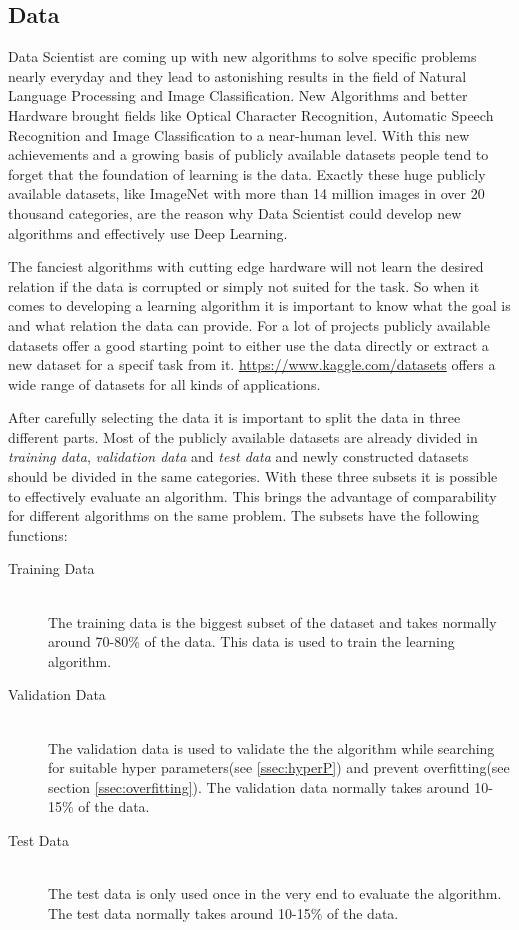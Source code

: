 \subsection{Data}\label{ssec:dataTheory}
Data Scientist are coming up with new algorithms to solve specific problems nearly everyday and they lead to astonishing results in the field of Natural Language Processing and Image Classification.
New Algorithms and better Hardware brought fields like Optical Character Recognition, Automatic Speech Recognition and Image Classification to a near-human level. 
With this new achievements and a growing basis of publicly available datasets people tend to forget that the foundation of learning is the data. Exactly these huge publicly available datasets, like ImageNet\cite{ImageNet} with more than 14 million images in over 20 thousand categories, are the reason why Data Scientist could develop new algorithms and effectively use Deep Learning.


The fanciest algorithms with cutting edge hardware will not learn the desired relation if the data is corrupted or simply not suited for the task.
So when it comes to developing a learning algorithm it is important to know what the goal is and what relation the data can provide.
For a lot of projects publicly available datasets offer a good starting point to either use the data directly or extract a new dataset for a specif task from it. 
\url{https://www.kaggle.com/datasets} offers a wide range of datasets for all kinds of applications.

After carefully selecting the data it is important to split the data in three different parts. 
Most of the publicly available datasets are already divided in \emph{training data}, \emph{validation data} and \emph{test data} and newly constructed datasets should be divided in the same categories.
With these three subsets it is possible to effectively evaluate an algorithm.
This brings the advantage of comparability for different algorithms on the same problem.
The subsets have the following functions:

\begin{description}
\item[Training Data]\hfill \\
The training data is the biggest subset of the dataset and takes normally around 70-80\% of the data. This data is used to train the learning algorithm.
\item[Validation Data]\hfill \\ 
The validation data is used to validate the the algorithm while searching for suitable hyper parameters(see \ref{ssec:hyperP}) and prevent overfitting(see section \ref{ssec:overfitting}).
The validation data normally takes around 10-15\% of the data.
\item[Test Data]\hfill \\ 
The test data is only used once in the very end to evaluate the algorithm.
The test data normally takes around 10-15\% of the data.
\end{description}

